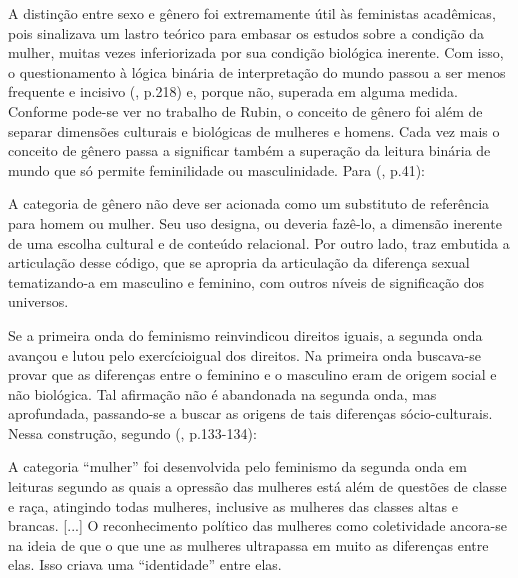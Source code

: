 A distinção entre sexo e gênero foi extremamente útil às feministas acadêmicas, pois sinalizava um lastro teórico para embasar os estudos sobre a condição da mulher, muitas vezes inferiorizada por sua condição biológica inerente. Com isso, o questionamento à lógica binária de interpretação do mundo passou a ser menos frequente e incisivo  (\citeyear{HARAWAY2004}, p.218) e, porque não, superada em alguma medida. Conforme pode-se ver no trabalho de Rubin, o conceito de gênero foi além de separar dimensões culturais e biológicas de mulheres e homens. Cada vez mais o conceito de gênero passa a significar também a superação da leitura binária de mundo que só permite feminilidade ou masculinidade. Para  (\citeyear{HEILBORN1992}, p.41):

\begin{citacao}
A categoria de gênero não deve ser acionada como um substituto de referência para homem ou mulher. Seu uso designa, ou deveria fazê-lo, a dimensão inerente de uma escolha cultural e de conteúdo relacional. Por outro lado, traz embutida a articulação desse código, que se apropria da articulação da diferença sexual tematizando-a em masculino e feminino, com outros níveis de significação dos universos.
\end{citacao}

Se a primeira onda do feminismo reinvindicou direitos iguais, a segunda onda avançou e lutou pelo exercícioigual dos direitos. Na primeira onda buscava-se provar que as diferenças entre o feminino e o masculino eram de origem social e não biológica. Tal afirmação não é abandonada na segunda onda, mas aprofundada, passando-se a buscar as origens de tais diferenças sócio-culturais. Nessa construção, segundo  (\citeyear{PISCITELLI2009}, p.133-134):

\begin{citacao}
A categoria ``mulher'' foi desenvolvida pelo feminismo da segunda onda em leituras segundo as quais a opressão das mulheres está além de questões de classe e raça, atingindo todas mulheres, inclusive as mulheres das classes altas e brancas. [...] O reconhecimento político das mulheres como coletividade ancora-se na ideia de que o que une as mulheres ultrapassa em muito as diferenças entre elas. Isso criava uma ``identidade'' entre elas.
\end{citacao}

